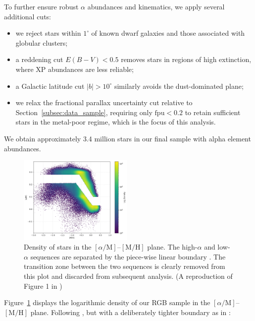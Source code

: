 \documentclass[a4paper,12pt]{article}
\begin{document}
To further ensure robust $\alpha$ abundances and kinematics, we apply 
several additional cuts:
\begin{itemize}\setlength\itemsep{2pt}
  \item we reject stars within $1^\circ$ of known dwarf galaxies and 
        those associated with globular clusters;
  \item a reddening cut $E(B-V)<0.5$ removes stars in regions of high 
        extinction, where XP abundances are less reliable;
  \item a Galactic latitude cut $|b|>10^\circ$ similarly avoids 
        the dust-dominated plane;
  \item we relax the fractional parallax uncertainty cut relative to 
        Section~\ref{subsec:data_sample}, requiring only $\mathrm{fpu}<0.2$
        to retain sufficient stars in the metal-poor regime, which is 
        the focus of this analysis.
\end{itemize}


We obtain approximately 3.4 million stars in our final sample with alpha element abundances.

\begin{figure}[h]
    \centering
    \includegraphics[width=0.49\textwidth]{../figures/alpha_vs_metalicity.png}
    \caption{Density of stars in the $[\alpha/\mathrm{M}]$–$[\mathrm{M/H}]$ plane.
             The high-$\alpha$ and low-$\alpha$ sequences are separated by the
             piece-wise linear boundary . The transition zone
             between the two sequences is clearly removed from this plot and discarded from
             subsequent analysis. (A reproduction of Figure 1 in \citet{Vis2024})}
    \label{fig:alphametal}
\end{figure}


  
Figure~\ref{fig:alphametal} displays the logarithmic density of our
RGB sample in the $[\alpha/\mathrm{M}]$–$[\mathrm{M/H}]$ plane.  Following
\citet{Chandra_2024}, but with a deliberately tighter boundary as in \citet{Vis2024}:
\end{document}

